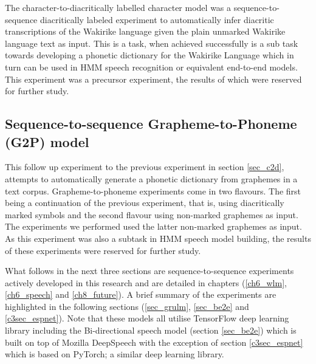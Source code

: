 The character-to-diacritically labelled character model was a sequence-to-sequence diacritically labeled experiment to automatically infer diacritic transcriptions of the Wakirike language given the plain unmarked Wakirike language text as input.  This is a task, when achieved successfully is a sub task towards developing a phonetic dictionary for the Wakirike Language which in turn can be used in HMM speech recognition or equivalent  end-to-end models.  This experiment was a precursor experiment, the results of which were reserved for further study.
\subsection{Sequence-to-sequence Grapheme-to-Phoneme (G2P) model}
This follow up experiment to the previous experiment in section \ref{sec_c2d},  attempts to automatically generate a phonetic dictionary from graphemes in a text corpus. Grapheme-to-phoneme experiments come in two flavours. The first being a continuation of the previous experiment, that is, using diacritically marked symbols and the second flavour using non-marked graphemes as input.  The experiments we performed used the latter non-marked graphemes as input. As this experiment was also a subtask in HMM speech model building,  the results of these experiments were reserved for further study.

What follows in the next three sections are sequence-to-sequence experiments actively developed in this research and are detailed in chapters (\ref{ch6_wlm},\ref{ch6_speech} and \ref{ch8_future}).  A brief summary of the experiments are highlighted in the following sections (\ref{sec_grulm}, \ref{sec_be2e} and \ref{c3sec_espnet}).  Note that these models all utilise TensorFlow deep learning library including the Bi-directional speech model (section \ref{sec_be2e}) which is built on top of Mozilla DeepSpeech with the exception of section \ref{c3sec_espnet} which is based on PyTorch; a similar deep learning library.

